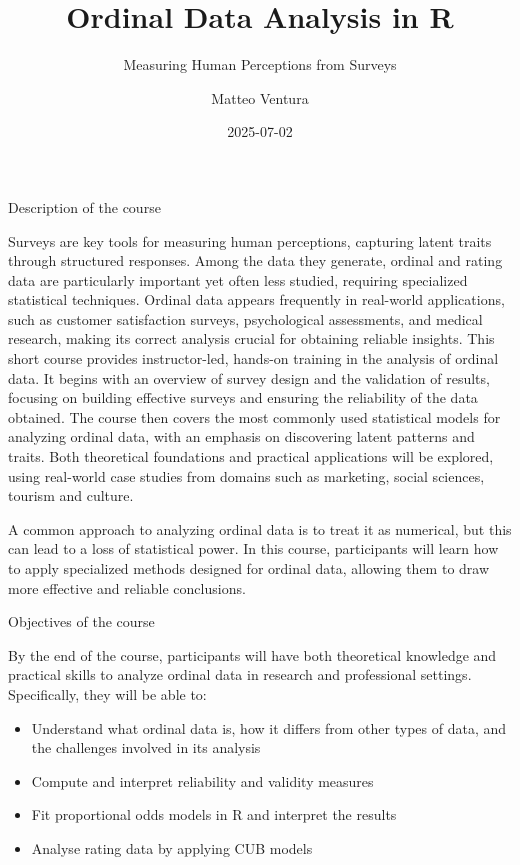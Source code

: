 \documentclass[
  letterpaper,
  DIV=11,
  numbers=noendperiod]{scrartcl}
\title{Ordinal Data Analysis in R}
\subtitle{Measuring Human Perceptions from Surveys}
\author{Matteo Ventura}
\date{2025-07-02}
\providecommand{\tightlist}{%
  \setlength{\itemsep}{0pt}\setlength{\parskip}{0pt}}\usepackage{longtable,booktabs,array}
\begin{document}
\maketitle
\ifdefined\Shaded\renewenvironment{Shaded}{\begin{tcolorbox}[interior hidden, sharp corners, breakable, borderline west={3pt}{0pt}{shadecolor}, boxrule=0pt, enhanced, frame hidden]}{\end{tcolorbox}}\fi

Description of the course

Surveys are key tools for measuring human perceptions, capturing latent
traits through structured responses. Among the data they generate,
ordinal and rating data are particularly important yet often less
studied, requiring specialized statistical techniques. Ordinal data
appears frequently in real-world applications, such as customer
satisfaction surveys, psychological assessments, and medical research,
making its correct analysis crucial for obtaining reliable insights.
This short course provides instructor-led, hands-on training in the
analysis of ordinal data. It begins with an overview of survey design
and the validation of results, focusing on building effective surveys
and ensuring the reliability of the data obtained. The course then
covers the most commonly used statistical models for analyzing ordinal
data, with an emphasis on discovering latent patterns and traits. Both
theoretical foundations and practical applications will be explored,
using real-world case studies from domains such as marketing, social
sciences, tourism and culture.

A common approach to analyzing ordinal data is to treat it as numerical,
but this can lead to a loss of statistical power. In this course,
participants will learn how to apply specialized methods designed for
ordinal data, allowing them to draw more effective and reliable
conclusions.

Objectives of the course

By the end of the course, participants will have both theoretical
knowledge and practical skills to analyze ordinal data in research and
professional settings. Specifically, they will be able to:

\begin{itemize}
\tightlist
\item
  Understand what ordinal data is, how it differs from other types of
  data, and the challenges involved in its analysis
\item
  Compute and interpret reliability and validity measures
\item
  Fit proportional odds models in R and interpret the results
\item
  Analyse rating data by applying CUB models
\end{itemize}
\end{document}
